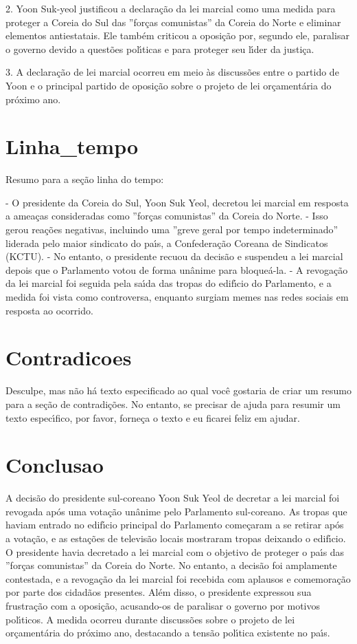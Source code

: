 \documentclass[article,11pt,oneside,a4paper,brazil,sumario=tradicional]{abntex2}%
\begin{document}
2. Yoon Suk-yeol justificou a declara\c{c}\~ao da lei marcial como uma medida para proteger a Coreia do Sul das ''for\c{c}as comunistas'' da Coreia do Norte e eliminar elementos antiestatais. Ele tamb\'em criticou a oposi\c{c}\~ao por, segundo ele, paralisar o governo devido a quest\~oes pol{\'\i}ticas e para proteger seu l{\'\i}der da justi\c{c}a.

3. A declara\c{c}\~ao de lei marcial ocorreu em meio \`as discuss\~oes entre o partido de Yoon e o principal partido de oposi\c{c}\~ao sobre o projeto de lei or\c{c}ament\'aria do pr\'oximo ano.

%
\section{Linha\_tempo}%
\label{sec:Linhatempo}%
Resumo para a se\c{c}\~ao linha do tempo:

- O presidente da Coreia do Sul, Yoon Suk Yeol, decretou lei marcial em resposta a amea\c{c}as consideradas como ''for\c{c}as comunistas'' da Coreia do Norte.
- Isso gerou rea\c{c}\~oes negativas, incluindo uma ''greve geral por tempo indeterminado'' liderada pelo maior sindicato do pa{\'\i}s, a Confedera\c{c}\~ao Coreana de Sindicatos (KCTU).
- No entanto, o presidente recuou da decis\~ao e suspendeu a lei marcial depois que o Parlamento votou de forma un\^anime para bloque\'a-la.
- A revoga\c{c}\~ao da lei marcial foi seguida pela sa{\'\i}da das tropas do edif{\'\i}cio do Parlamento, e a medida foi vista como controversa, enquanto surgiam memes nas redes sociais em resposta ao ocorrido.

%
\section{Contradicoes}%
\label{sec:Contradicoes}%
Desculpe, mas n\~ao h\'a texto especificado ao qual voc\^e gostaria de criar um resumo para a se\c{c}\~ao de contradi\c{c}\~oes. No entanto, se precisar de ajuda para resumir um texto espec{\'\i}fico, por favor, forne\c{c}a o texto e eu ficarei feliz em ajudar.

%
\section{Conclusao}%
\label{sec:Conclusao}%
A decis\~ao do presidente sul-coreano Yoon Suk Yeol de decretar a lei marcial foi revogada ap\'os uma vota\c{c}\~ao un\^anime pelo Parlamento sul-coreano. As tropas que haviam entrado no edif{\'\i}cio principal do Parlamento come\c{c}aram a se retirar ap\'os a vota\c{c}\~ao, e as esta\c{c}\~oes de televis\~ao locais mostraram tropas deixando o edif{\'\i}cio. O presidente havia decretado a lei marcial com o objetivo de proteger o pa{\'\i}s das ''for\c{c}as comunistas'' da Coreia do Norte. No entanto, a decis\~ao foi amplamente contestada, e a revoga\c{c}\~ao da lei marcial foi recebida com aplausos e comemora\c{c}\~ao por parte dos cidad\~aos presentes. Al\'em disso, o presidente expressou sua frustra\c{c}\~ao com a oposi\c{c}\~ao, acusando-os de paralisar o governo por motivos pol{\'\i}ticos. A medida ocorreu durante discuss\~oes sobre o projeto de lei or\c{c}ament\'aria do pr\'oximo ano, destacando a tens\~ao pol{\'\i}tica existente no pa{\'\i}s.

%
%
\end{document}
